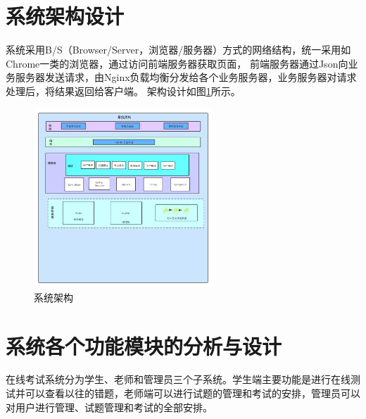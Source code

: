 \section{系统架构设计}
系统采用B/S（Browser/Server，浏览器/服务器）方式的网络结构，统一采用如Chrome一类的浏览器，通过访问前端服务器获取页面，
前端服务器通过Json向业务服务器发送请求，由Nginx负载均衡分发给各个业务服务器，业务服务器对请求处理后，将结果返回给客户端。
架构设计如图\ref{figure:jiagou}所示。
\begin{figure}[!htbp]
\centering
\includegraphics[width=0.6\textwidth,keepaspectratio]{data/chapter-2/jiagou.png}
\caption{系统架构}
\label{figure:jiagou}
\end{figure}

\section{系统各个功能模块的分析与设计}
在线考试系统分为学生、老师和管理员三个子系统。学生端主要功能是进行在线测试并可以查看以往的错题，老师端可以进行试题的管理和考试的安排，管理员可以对用户进行管理、试题管理和考试的全部安排。

